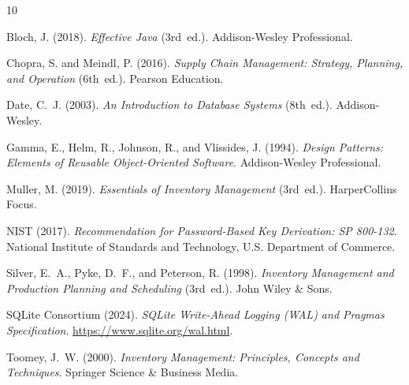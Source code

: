 \documentclass[BTech]{srmuthesis}
\begin{document}
\begin{singlespace}
\begin{thebibliography}{10}

Bloch, J. (2018).
\newblock \emph{Effective Java} (3rd~ed.).
\newblock Addison-Wesley Professional.

Chopra, S. and Meindl, P. (2016).
\newblock \emph{Supply Chain Management: Strategy, Planning, and Operation} (6th~ed.).
\newblock Pearson Education.

Date, C.~J. (2003).
\newblock \emph{An Introduction to Database Systems} (8th~ed.).
\newblock Addison-Wesley.

Gamma, E., Helm, R., Johnson, R., and Vlissides, J. (1994).
\newblock \emph{Design Patterns: Elements of Reusable Object-Oriented Software}.
\newblock Addison-Wesley Professional.

Muller, M. (2019).
\newblock \emph{Essentials of Inventory Management} (3rd~ed.).
\newblock HarperCollins Focus.

NIST (2017).
\newblock \emph{Recommendation for Password-Based Key Derivation: SP 800-132}.
\newblock National Institute of Standards and Technology, U.S. Department of Commerce.

Silver, E.~A., Pyke, D.~F., and Peterson, R. (1998).
\newblock \emph{Inventory Management and Production Planning and Scheduling} (3rd~ed.).
\newblock John Wiley \& Sons.

SQLite Consortium (2024).
\newblock \emph{SQLite Write-Ahead Logging (WAL) and Pragmas Specification}.
\newblock \url{https://www.sqlite.org/wal.html}.

Toomey, J.~W. (2000).
\newblock \emph{Inventory Management: Principles, Concepts and Techniques}.
\newblock Springer Science \& Business Media.

\end{thebibliography}
\end{singlespace}
\end{document}
